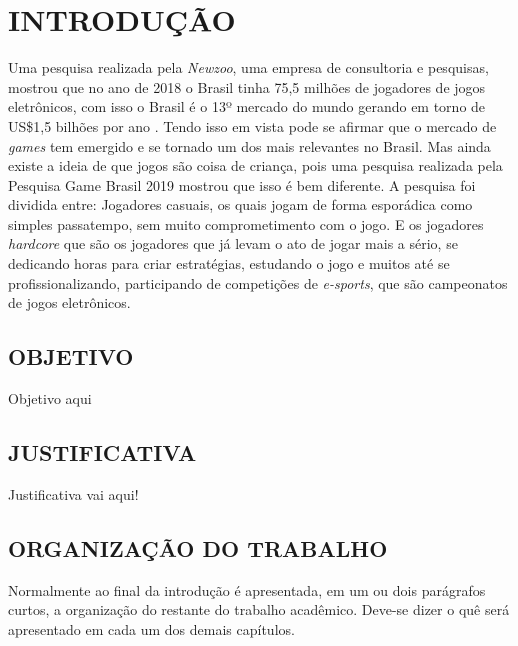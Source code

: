 
\chapter{INTRODUÇÃO}
\label{chap:introducao}

Uma pesquisa realizada pela \textit{Newzoo}, uma empresa de consultoria e pesquisas, mostrou que no ano de 2018 o Brasil tinha 75,5 milhões de jogadores de jogos eletrônicos, com isso o Brasil é o 13º mercado do mundo gerando em torno de US\$1,5 bilhões por ano \cite{NEWZOO18}.
Tendo isso em vista pode se afirmar que o mercado de \textit{games} tem emergido e se tornado um dos mais relevantes no Brasil. 
Mas ainda existe a ideia de que jogos são coisa de criança, pois uma pesquisa realizada pela Pesquisa Game Brasil 2019 mostrou que isso é bem diferente. A pesquisa foi dividida entre: Jogadores casuais, os quais jogam de forma esporádica como simples passatempo, sem muito comprometimento com o jogo. E os jogadores \textit{hardcore} que são os jogadores que já levam o ato de jogar mais a sério, se dedicando horas para criar estratégias, estudando o jogo e muitos até se profissionalizando, participando de competições de \textit{e-sports}, que são campeonatos de jogos eletrônicos.
\section{OBJETIVO}
\label{sec:objetivo}

Objetivo aqui

\section{JUSTIFICATIVA}
\label{sec:justificativa}

Justificativa vai aqui!

\section{ORGANIZAÇÃO DO TRABALHO}
\label{sec:organizacaoTrabalho}

Normalmente ao final da introdução é apresentada, em um ou dois parágrafos curtos, a organização do restante do trabalho acadêmico.
Deve-se dizer o quê será apresentado em cada um dos demais capítulos.
